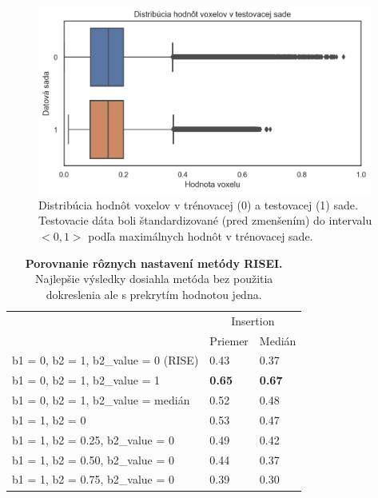 \begin{figure}[h!]
    \centering
    \includegraphics[width=11cm]{assets/images/test_dataset_voxel_distribution.png}
    \caption{Distribúcia hodnôt voxelov v trénovacej (0) a testovacej (1) sade. Testovacie dáta boli štandardizované (pred zmenšením) do intervalu $<0, 1>$ podľa maximálnych hodnôt v trénovacej sade.}
    \label{fig:test_dataset_voxel_distribution}
\end{figure}

\begin{table}[]
    \centering
    \begin{tabular}{l|l|l|}
        \cline{2-3}
                                                                    & \multicolumn{2}{c|}{Insertion} \\ \cline{2-3} 
                                                                    & Priemer        & Medián        \\ \hline
        \multicolumn{1}{|l|}{b1 =  0, b2 = 1, b2\_value = 0 (RISE)} & 0.43           & 0.37          \\ \hline
        \multicolumn{1}{|l|}{b1 =  0, b2 = 1, b2\_value = 1}        & \textbf{0.65}  & \textbf{0.67} \\ \hline
        \multicolumn{1}{|l|}{b1 =  0, b2 = 1, b2\_value = medián}     & 0.52           & 0.48          \\ \hline
        \multicolumn{1}{|l|}{b1 =  1, b2 = 0}                        & 0.53           & 0.47          \\ \hline
        \multicolumn{1}{|l|}{b1 =  1, b2 = 0.25, b2\_value = 0}     & 0.49           & 0.42          \\ \hline
        \multicolumn{1}{|l|}{b1 =  1, b2 = 0.50, b2\_value = 0}      & 0.44           & 0.37          \\ \hline
        \multicolumn{1}{|l|}{b1 =  1, b2 = 0.75, b2\_value = 0}     & 0.39           & 0.30          \\ \hline
    \end{tabular}
    \caption{\textbf{Porovnanie rôznych nastavení metódy RISEI.} Najlepšie výsledky dosiahla metóda bez použitia dokreslenia ale s prekrytím hodnotou jedna.}
    \label{tab:experiment_risei_various_configuration}
\end{table}


